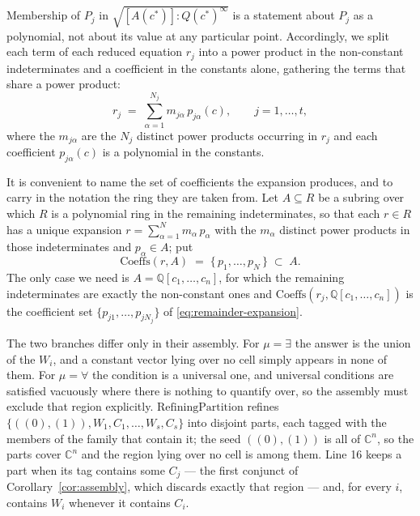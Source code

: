 \documentclass{article}
\theoremstyle{definition}
\theoremstyle{plain}
\begin{document}
Membership of $P_j$ in $\sqrt{[A(c^*)] : Q(c^*)^\infty}$ is a statement about $P_j$ as a
polynomial, not about its value at any particular point.
Accordingly, we split each term of each reduced equation $r_j$ into a power product
in the non-constant indeterminates and a coefficient in the constants alone,
gathering the terms that share a power product:
%
\begin{equation}
\label{eq:remainder-expansion}
r_j \;=\; \sum_{\alpha=1}^{N_j} m_{j\alpha} \, p_{j\alpha}(c),
\qquad j = 1, \ldots, t,
\end{equation}
%
where the $m_{j\alpha}$ are the $N_j$ distinct power products occurring in $r_j$
and each coefficient $p_{j\alpha}(c)$ is a polynomial in the constants.

It is convenient to name the set of coefficients the expansion
produces, and to carry in the notation the ring they are taken from.
Let $A \subseteq R$ be a subring over which $R$ is a polynomial ring in the
remaining indeterminates, so that each $r \in R$ has a unique expansion
$r = \sum_{\alpha=1}^{N} m_\alpha \, p_\alpha$ with the $m_\alpha$ distinct
power products in those indeterminates and $p_\alpha \in A$; put
%
\begin{equation}
\label{eq:coeff-operator}
\mathrm{Coeffs}(r, A) \;=\; \{\, p_1, \ldots, p_N \,\} \;\subset\; A .
\end{equation}
%
The only case we need is $A = \mathbb{Q}[c_1, \ldots, c_n]$, for which the
remaining indeterminates are exactly the non-constant ones and
$\mathrm{Coeffs}(r_j, \mathbb{Q}[c_1, \ldots, c_n])$ is the coefficient set
$\{p_{j1}, \ldots, p_{jN_j}\}$ of \eqref{eq:remainder-expansion}.

The two branches differ only in their assembly.  For $\mu = \exists$ the
answer is the union of the $W_i$, and a constant vector lying over no cell
simply appears in none of them.  For $\mu = \forall$ the condition is a
universal one, and universal conditions are satisfied vacuously where there is
nothing to quantify over, so the assembly must exclude that region explicitly.
$\mathrm{RefiningPartition}$ refines
$\{((0),(1)), W_1, C_1, \ldots, W_s, C_s\}$ into disjoint parts, each tagged
with the members of the family that contain it; the seed $((0),(1))$ is all of
$\mathbb{C}^n$, so the parts cover $\mathbb{C}^n$ and the region lying over no
cell is among them.  Line 16 keeps a part when its tag contains some $C_j$ ---
the first conjunct of Corollary~\ref{cor:assembly}, which discards exactly that
region --- and, for every $i$, contains $W_i$ whenever it contains $C_i$.
\end{document}
